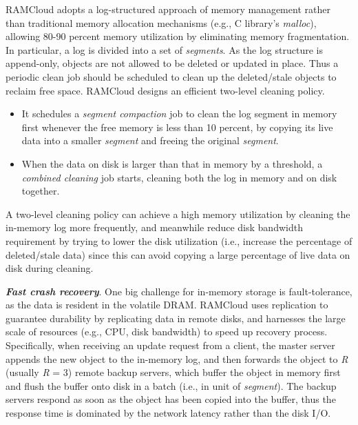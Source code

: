 \documentclass[twocolumn]{article}
\begin{document}
RAMCloud adopts a log-structured approach of memory management rather
than traditional memory allocation mechanisms (e.g., C library's
\emph{malloc}), allowing 80-90 percent memory utilization by eliminating
memory fragmentation. In particular, a log is divided into a set of
\emph{segments}. As the log structure is append-only, objects are not
allowed to be deleted or updated in place. Thus a periodic clean job
should be scheduled to clean up the deleted/stale objects to reclaim
free space. RAMCloud designs an efficient two-level cleaning policy.

\begin{itemize}
\item
  It schedules a \emph{segment compaction} job to clean the log segment
  in memory first whenever the free memory is less than 10 percent, by
  copying its live data into a smaller \emph{segment} and freeing the
  original \emph{segment}.
\item
  When the data on disk is larger than that in memory by a threshold, a
  \emph{combined cleaning} job starts, cleaning both the log in memory
  and on disk together.
\end{itemize}

A two-level cleaning policy can achieve a high memory utilization by
cleaning the in-memory log more frequently, and meanwhile reduce disk
bandwidth requirement by trying to lower the disk utilization (i.e.,
increase the percentage of deleted/stale data) since this can avoid
copying a large percentage of live data on disk during cleaning.

\noindent
\textbf{\emph{Fast crash recovery}}. One big challenge for in-memory storage is
fault-tolerance, as the data is resident in the volatile
DRAM. 
RAMCloud uses replication to guarantee durability by replicating data in remote disks,
and harnesses the large scale of resources (e.g., CPU, disk bandwidth)
to speed up recovery process. Specifically, when receiving an update
request from a client, the master server appends the new object to the
in-memory log, and then forwards the object to \emph{R} (usually
\emph{R} = 3) remote backup servers, which buffer the object in memory
first and flush the buffer onto disk in a batch (i.e., in unit of
\emph{segment}). The backup servers respond as soon as the object has
been copied into the buffer, thus the response time is dominated by the
network latency rather than the disk I/O.
\end{document}
